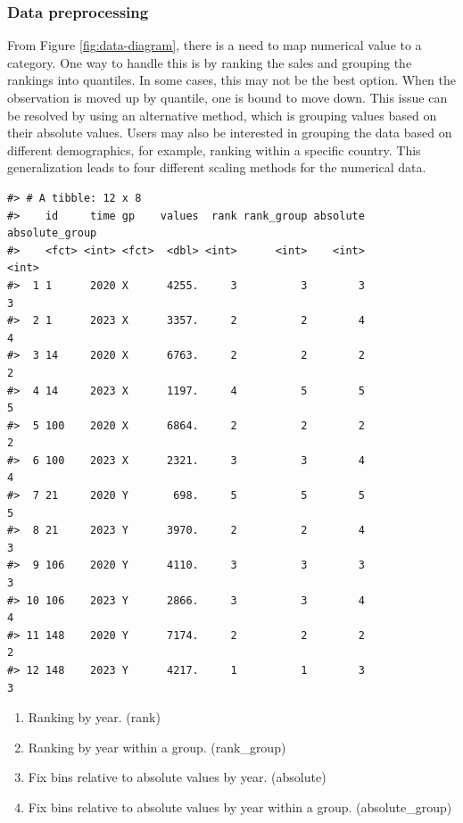 \hypertarget{data-preprocessing}{%
\subsubsection{Data preprocessing}\label{data-preprocessing}}

From Figure \ref{fig:data-diagram}, there is a need to map numerical value to a category. One way to handle this is by ranking the sales and grouping the rankings into quantiles. In some cases, this may not be the best option. When the observation is moved up by quantile, one is bound to move down. This issue can be resolved by using an alternative method, which is grouping values based on their absolute values. Users may also be interested in grouping the data based on different demographics, for example, ranking within a specific country. This generalization leads to four different scaling methods for the numerical data.

\begin{verbatim}
#> # A tibble: 12 x 8
#>    id     time gp    values  rank rank_group absolute absolute_group
#>    <fct> <int> <fct>  <dbl> <int>      <int>    <int>          <int>
#>  1 1      2020 X      4255.     3          3        3              3
#>  2 1      2023 X      3357.     2          2        4              4
#>  3 14     2020 X      6763.     2          2        2              2
#>  4 14     2023 X      1197.     4          5        5              5
#>  5 100    2020 X      6864.     2          2        2              2
#>  6 100    2023 X      2321.     3          3        4              4
#>  7 21     2020 Y       698.     5          5        5              5
#>  8 21     2023 Y      3970.     2          2        4              3
#>  9 106    2020 Y      4110.     3          3        3              3
#> 10 106    2023 Y      2866.     3          3        4              4
#> 11 148    2020 Y      7174.     2          2        2              2
#> 12 148    2023 Y      4217.     1          1        3              3
\end{verbatim}

\begin{enumerate}
\def\labelenumi{\arabic{enumi}.}
\tightlist
\item
  Ranking by year. (rank)
\item
  Ranking by year within a group. (rank\_group)
\item
  Fix bins relative to absolute values by year. (absolute)
\item
  Fix bins relative to absolute values by year within a group. (absolute\_group)
\end{enumerate}

